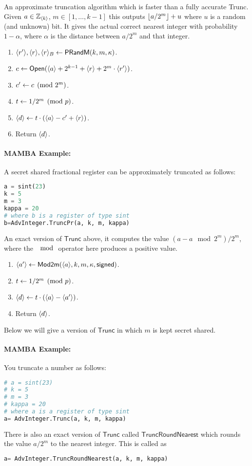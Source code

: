   An approximate truncation algorithm which is faster than
  a fully accurate Trunc.
  Given $a \in {\mathbb{Z}}_{\langle k \rangle}$, $m \in [1,\ldots,k-1]$
  this outputs ${\lfloor a/2^m \rfloor}+u$ where $u$ is a random
  (and unknown) bit.
  It gives the actual correct nearest integer with
  probability $1-\alpha$, where $\alpha$ is the distance
  between $a/2^m$ and that integer.
  \begin{enumerate}
    \item $\langle r' \rangle, \langle r \rangle, \langle r \rangle_B \leftarrow \mathsf{PRandM}(k,m,\kappa)$.
    \item $c \leftarrow {\mathsf{Open}}(\langle a \rangle+2^{k-1}+\langle r \rangle+2^m \cdot \langle r' \rangle)$.
    \item $c'\leftarrow c \pmod{2^m}$.
    \item $t \leftarrow 1/2^m \pmod{p}$.
    \item $\langle d \rangle \leftarrow t \cdot (\langle a \rangle-c'+\langle r \rangle)$.
    \item Return $\langle d \rangle$.
  \end{enumerate}
  \paragraph{MAMBA Example:} A secret shared fractional register can be approximately truncated as follows:
  \begin{lstlisting}[language={python}]
a = sint(23)
k = 5
m = 3
kappa = 20
# where b is a register of type sint
b=AdvInteger.TruncPr(a, k, m, kappa)
\end{lstlisting}

  An exact version of $\mathsf{Trunc}$ above, it computes the value
$(a-a \mod{2^m})/2^m$, where the $\mod$ operator here produces a positive value.
  \begin{enumerate}
    \item $\langle a' \rangle \leftarrow \mathsf{Mod2m}(\langle a \rangle,k,m, \kappa, {\mathsf{signed}})$.
    \item $t \leftarrow 1/2^m \pmod{p}$.
    \item $\langle d \rangle \leftarrow t \cdot (\langle a \rangle-\langle a' \rangle)$.
    \item Return $\langle d \rangle$.
  \end{enumerate}
  Below we will give a version of $\mathsf{Trunc}$ in which $m$ is kept secret shared.

  \paragraph{MAMBA Example:} You truncate a number as follows:
  \begin{lstlisting}[language={python}]
# a = sint(23)
# k = 5
# m = 3
# kappa = 20
# where a is a register of type sint
a= AdvInteger.Trunc(a, k, m, kappa)
\end{lstlisting}
  There is also an exact version of $\mathsf{Trunc}$ called $\mathsf{TruncRoundNearest}$
  which rounds the value $a/2^m$ to the nearest integer.
  This is called as
  \begin{lstlisting}[language={python}]
a= AdvInteger.TruncRoundNearest(a, k, m, kappa)
\end{lstlisting}



